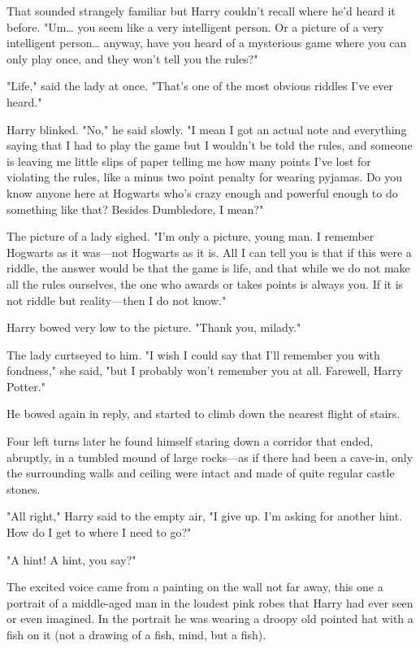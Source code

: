 That sounded strangely familiar but Harry couldn't recall where he'd heard it
before. "Um{\ldots} you seem like a very intelligent person. Or a picture of a
very intelligent person{\ldots} anyway, have you heard of a mysterious game
where you can only play once, and they won't tell you the rules?"

"Life," said the lady at once. "That's one of the most obvious riddles I've
ever heard."

Harry blinked. "No," he said slowly. "I mean I got an actual note and
everything saying that I had to play the game but I wouldn't be told the rules,
and someone is leaving me little slips of paper telling me how many points I've
lost for violating the rules, like a minus two point penalty for wearing
pyjamas. Do you know anyone here at Hogwarts who's crazy enough and powerful
enough to do something like that? Besides Dumbledore, I mean?"

The picture of a lady sighed. "I'm only a picture, young man. I remember
Hogwarts as it was---not Hogwarts as it is. All I can tell you is that if this
were a riddle, the answer would be that the game is life, and that while we do
not make all the rules ourselves, the one who awards or takes points is always
you. If it is not riddle but reality---then I do not know."

Harry bowed very low to the picture. "Thank you, milady."

The lady curtseyed to him. "I wish I could say that I'll remember you with
fondness," she said, "but I probably won't remember you at all. Farewell, Harry
Potter."

He bowed again in reply, and started to climb down the nearest flight of stairs.

Four left turns later he found himself staring down a corridor that ended,
abruptly, in a tumbled mound of large rocks---as if there had been a cave-in,
only the surrounding walls and ceiling were intact and made of quite regular
castle stones.

"All right," Harry said to the empty air, "I give up. I'm asking for another
hint. How do I get to where I need to go?"

"A hint! A hint, you say?"

The excited voice came from a painting on the wall not far away, this one a
portrait of a middle-aged man in the loudest pink robes that Harry had ever
seen or even imagined. In the portrait he was wearing a droopy old pointed hat
with a fish on it (not a drawing of a fish, mind, but a fish).

